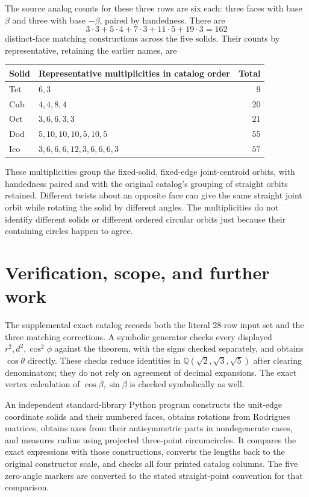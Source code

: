 \documentclass[11pt]{article}
\theoremstyle{definition}
\begin{document}
The source analog counts for these three rows are six each: three faces
with base $\beta$ and three with base $-\beta$, paired by handedness.
There are
\[
 3\cdot3+5\cdot4+7\cdot3+11\cdot5+19\cdot3=162
\]
distinct-face matching constructions across the five solids. Their counts
by representative, retaining the earlier names, are
\begin{center}
\small\renewcommand{\arraystretch}{1.2}
\begin{tabular}{@{}llr@{}}
\toprule
Solid & Representative multiplicities in catalog order & Total\\
\midrule
Tet & $6,3$ & $9$\\
Cub & $4,4,8,4$ & $20$\\
Oct & $3,6,6,3,3$ & $21$\\
Dod & $5,10,10,10,5,10,5$ & $55$\\
Ico & $3,6,6,6,12,3,6,6,6,3$ & $57$\\
\bottomrule
\end{tabular}
\end{center}
These multiplicities group the fixed-solid, fixed-edge joint-centroid orbits,
with handedness paired and with the original catalog's grouping of straight
orbits retained. Different twists about an opposite face can give the same
straight joint orbit while rotating the solid by different angles. The
multiplicities do not identify different solids or different ordered circular
orbits just because their containing circles happen to agree.

\section{Verification, scope, and further work}\label{sec:verification}
The supplemental exact catalog records both the literal 28-row input set
and the three matching corrections. A symbolic generator checks every
displayed $r^2,d^2,\cos^2\phi$ against the theorem, with the signs checked
separately, and obtains $\cos\theta$ directly. These checks reduce
identities in $\mathbb Q(\sqrt2,\sqrt3,\sqrt5)$ after clearing denominators;
they do not rely on agreement of decimal expansions. The exact vertex calculation
of $\cos\beta,\sin\beta$ is checked symbolically as well.

An independent standard-library Python program constructs the unit-edge
coordinate solids and their numbered faces, obtains rotations from
Rodrigues matrices, obtains axes from their antisymmetric parts in
nondegenerate cases, and measures radius using projected three-point
circumcircles. It compares the exact expressions with those constructions,
converts the lengths back to the original constructor scale, and checks all
four printed catalog columns. The five zero-angle markers are converted to
the stated straight-point convention for that comparison.
\end{document}
